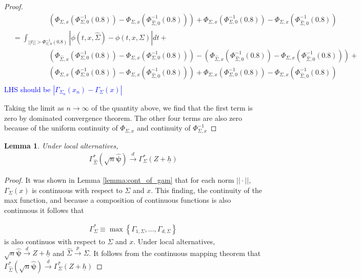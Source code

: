 \documentclass{article}
\newtheorem{lemma}[theorem]{Lemma}
\begin{document}
\begin{proof}
\begin{align*}
	& \hspace{5em} \left(\Phi_{\Sigma, x}(\Phi^{-1}_{\Sigma, 0}(0.8)) - \Phi_{\Sigma, x}(\Phi^{-1}_{\hat{\Sigma}, 0}(0.8))\right) +  \Phi_{\Sigma, x}(\Phi^{-1}_{\Sigma, 0}(0.8)) - \Phi_{\Sigma, x}(\Phi^{-1}_{\hat{\Sigma}, 0}(0.8)) \\
	& = \int_{||t|| > \Phi^{-1}_{\Sigma, 0}(0.8)} |\phi(t, x, \hat{\Sigma}) - \phi(t, x, \Sigma)|dt + \\
	& \hspace{5em} \left(\Phi_{\hat{\Sigma}, x}(\Phi^{-1}_{\Sigma, 0}(0.8)) - \Phi_{\Sigma, x}(\Phi^{-1}_{\Sigma, 0}(0.8)) \right) - \left(\Phi_{\hat{\Sigma}, x}(\Phi^{-1}_{\hat{\Sigma}, 0}(0.8)) -  \Phi_{\Sigma, x}(\Phi^{-1}_{\hat{\Sigma}, 0}(0.8))\right)+\\
	& \hspace{5em} \left(\Phi_{\Sigma, x}(\Phi^{-1}_{\Sigma, 0}(0.8)) - \Phi_{\Sigma, x}(\Phi^{-1}_{\hat{\Sigma}, 0}(0.8))\right) +  \Phi_{\Sigma, x}(\Phi^{-1}_{\Sigma, 0}(0.8)) - \Phi_{\Sigma, x}(\Phi^{-1}_{\hat{\Sigma}, 0}(0.8)) \\
\end{align*}
\textcolor{blue}{LHS should be $|\Gamma_{\Sigma_n}(x_n) - \Gamma_{\Sigma}(x)|$}

Taking the limit as $n \to \infty$ of the quantity above, we find that the first term is zero by dominated convergence theorem.  The other four terms are also zero because of the uniform continuity of $\Phi_{\Sigma, x}$ and continuity of $\Phi^{-1}_{\Sigma, x}$
\end{proof}

\begin{lemma}
Under local alternatives, 
	\begin{align*}
		\Gamma^*_{\hat{\Sigma}}(\sqrt{n} \hat{\boldsymbol{\psi}}) \xrightarrow{d} \Gamma^*_{\Sigma}(Z + \underline{h}) 
	\end{align*}
\end{lemma}

\begin{proof}
	It was shown in Lemma \ref{lemma:cont_of_gam} that for each norm $||\cdot||$, $\Gamma_{\Sigma}(x)$ is continuous with respect to $\Sigma$ and $x$.  This finding, the continuity of the max function, and because a composition of continuous functions is also continuous it follows that

	\begin{align*}
		\Gamma^*_{\Sigma} \equiv \max\left\{\Gamma_{1, \Sigma}, \dots, \Gamma_{d, \Sigma}\right\}
	\end{align*}
	is also continuos with respect to $\Sigma$ and $x$. Under local alternatives, $\sqrt{n} \hat{\boldsymbol{\psi}} \xrightarrow{d} Z + \underline{h}$ and $\hat{\Sigma} \xrightarrow{p} \Sigma$.   It follows from the continuous mapping theorem that $\Gamma^*_{\hat{\Sigma}}(\sqrt{n} \hat{\boldsymbol{\psi}}) \xrightarrow{d} \Gamma^*_{\Sigma}(Z + \underline{h}) $
\end{proof}
\end{document}
